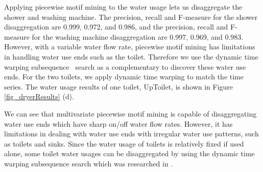 %
Applying piecewise motif mining to the water usage lets us disaggregate the
shower and washing machine. %
The precision, recall and F-measure for the shower disaggregation are 
0.999, 0.972, and 0.986,  
and the precision, recall and F-measure for the washing machine disaggregation are 
0.997, 0.969, and 0.983. 
However, with a variable water flow rate, 
piecewise motif mining has limitations in handling water use ends such as the toilet.
Therefore we use the dynamic time warping subsequence~\cite{rakthanmanon2012searching} search as a complementary to discover these water use ends.  
For the two toilets, we apply dynamic time warping to match the time series.
The water usage results of one toilet, UpToilet, is shown in Figure \ref{fig_dryerResults} (d). 

We can see that multivariate piecewise motif mining is capable of 
disaggregating water use ends which have sharp on/off water flow rates. 
However, it has limitations in dealing with water use ends with irregular water use patterns, 
such as toilets and sinks. 
Since the water usage of toilets is relatively fixed if used alone, 
some toilet water usages can be disaggregated by using the dynamic time warping subsequence search 
which was researched in \cite{nguyen2013development}. 

